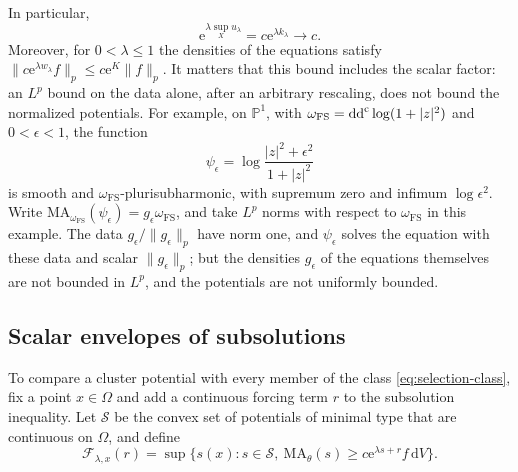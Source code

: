 In particular,
\[
 \mathrm{e}^{\lambda\sup_Xu_\lambda}
       =c\mathrm{e}^{\lambda k_\lambda}\longrightarrow c.
\]
Moreover, for $0<\lambda\leq1$ the densities of the equations satisfy $\|c\mathrm{e}^{\lambda w_\lambda}f\|_p\leq c\mathrm{e}^K\|f\|_p$. It matters that this bound includes the scalar factor: an $L^p$ bound on the data alone, after an arbitrary rescaling, does not bound the normalized potentials. For example, on $\mathbb P^1$, with $\omega_{\mathrm{FS}}=\mathrm{dd}^{\mathrm{c}}\log(1+|z|^2)$ and $0<\epsilon<1$, the function
\[
 \psi_\epsilon=\log\frac{|z|^2+\epsilon^2}{1+|z|^2}
\]
is smooth and $\omega_{\mathrm{FS}}$-plurisubharmonic, with supremum zero and infimum $\log\epsilon^2$. Write $\mathrm{MA}_{\omega_{\mathrm{FS}}}(\psi_\epsilon)=g_\epsilon\omega_{\mathrm{FS}}$, and take $L^p$ norms with respect to $\omega_{\mathrm{FS}}$ in this example. The data $g_\epsilon/\|g_\epsilon\|_p$ have norm one, and $\psi_\epsilon$ solves the equation with these data and scalar $\|g_\epsilon\|_p$; but the densities $g_\epsilon$ of the equations themselves are not bounded in $L^p$, and the potentials are not uniformly bounded.

\subsection{Scalar envelopes of subsolutions}

To compare a cluster potential with every member of the class \eqref{eq:selection-class}, fix a point $x\in\Omega$ and add a continuous forcing term $r$ to the subsolution inequality. Let $\mathcal S$ be the convex set of potentials of minimal type that are continuous on $\Omega$, and define
\begin{equation}\label{eq:selection-scalar-envelope}
 \mathcal F_{\lambda,x}(r)=
 \sup\{s(x):s\in\mathcal S,\
       \mathrm{MA}_\theta(s)\geq
              c\mathrm{e}^{\lambda s+r}f\,\mathrm{d}V\}.
\end{equation}


